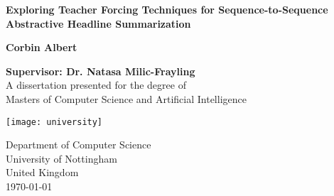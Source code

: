 \begin{titlepage}
  \thispagestyle{empty}
  \begin{center}
    \begin{singlespacing}
    \vspace*{1cm}

    
    \Huge
    \textbf{Exploring Teacher Forcing Techniques for Sequence-to-Sequence Abstractive Headline Summarization}

    
    \vspace{1.0cm}
    

    \vspace{3.5cm}

    \Large
    \textbf{Corbin Albert}
    

    \vfill

    \textbf{Supervisor: Dr. Natasa Milic-Frayling}\\
    \vspace{1.5cm}
    A dissertation presented for the degree of\\
    Masters of Computer Science and Artificial Intelligence

    
    \vspace{0.8cm}

    
    \texttt{[image: university]}

    \Large
    Department of Computer Science\\
    University of Nottingham\\
    United Kingdom\\
    \today
  \end{singlespacing}
  \end{center}
\end{titlepage}
